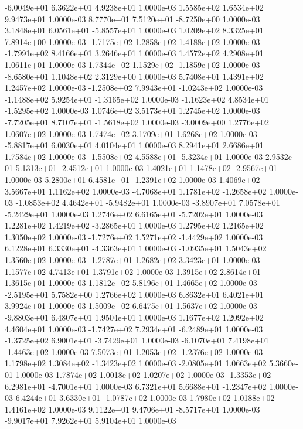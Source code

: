 -6.0049e+01  6.3622e+01  4.9238e+01  1.0000e-03
1.5585e+02 1.6534e+02 9.9473e+01  1.0000e-03
 8.7770e+01  7.5120e+01 -8.7250e+00  1.0000e-03
 3.1848e+01  6.0561e+01 -5.8557e+01  1.0000e-03
1.0209e+02 8.3325e+01 7.8914e+00  1.0000e-03
-1.7175e+02  1.2858e+02  1.4188e+02  1.0000e-03
-1.7991e+02  8.4166e+01  3.2646e+01  1.0000e-03
1.4572e+02 4.2908e+01 1.0611e+01  1.0000e-03
 1.7344e+02  1.1529e+02 -1.1859e+02  1.0000e-03
-8.6580e+01  1.1048e+02  2.3129e+00  1.0000e-03
5.7408e+01 1.4391e+02 1.2457e+02  1.0000e-03
-1.2508e+02  7.9943e+01 -1.0243e+02  1.0000e-03
-1.1488e+02  5.9254e+01 -1.3165e+02  1.0000e-03
-1.1623e+02  4.8534e+01 -1.5295e+02  1.0000e-03
1.0746e+02 3.5173e+01 1.2745e+02  1.0000e-03
-7.7205e+01  8.7107e+01 -1.5618e+02  1.0000e-03
-3.0009e+00  1.2776e+02  1.0607e+02  1.0000e-03
1.7474e+02 3.1709e+01 1.6268e+02  1.0000e-03
-5.8817e+01  6.0030e+01  4.0104e+01  1.0000e-03
8.2941e+01 2.6686e+01 1.7584e+02  1.0000e-03
-1.5508e+02  4.5588e+01 -5.3234e+01  1.0000e-03
 2.9532e-01  5.1313e+01 -2.4512e+01  1.0000e-03
 1.4021e+01  1.1478e+02 -2.9567e+01  1.0000e-03
 5.2800e+01  6.4581e+01 -1.2391e+02  1.0000e-03
1.4069e+02 3.5667e+01 1.1162e+02  1.0000e-03
-4.7068e+01  1.1781e+02 -1.2658e+02  1.0000e-03
-1.0853e+02  4.4642e+01 -5.9482e+01  1.0000e-03
-3.8907e+01  7.0578e+01 -5.2429e+01  1.0000e-03
 1.2746e+02  6.6165e+01 -5.7202e+01  1.0000e-03
 1.2281e+02  1.4219e+02 -3.2865e+01  1.0000e-03
1.2795e+02 1.2165e+02 1.3050e+02  1.0000e-03
-1.7276e+02  1.5271e+02 -1.4429e+02  1.0000e-03
 6.1228e+01  6.3330e+01 -4.3363e+01  1.0000e-03
-1.0935e+01  1.5043e+02  1.3560e+02  1.0000e-03
-1.2787e+01  1.2682e+02  3.3423e+01  1.0000e-03
1.1577e+02 4.7413e+01 1.3791e+02  1.0000e-03
1.3915e+02 2.8614e+01 1.3615e+01  1.0000e-03
1.1812e+02 5.8196e+01 1.4665e+02  1.0000e-03
-2.5195e+01  5.7582e+00  1.2766e+02  1.0000e-03
6.8632e+01 6.4021e+01 3.9924e+01  1.0000e-03
1.5009e+02 6.6475e+01 1.5637e+02  1.0000e-03
-9.8803e+01  6.4807e+01  1.9504e+01  1.0000e-03
1.1677e+02 1.2092e+02 4.4604e+01  1.0000e-03
-1.7427e+02  7.2934e+01 -6.2489e+01  1.0000e-03
-1.3725e+02  6.9001e+01 -3.7429e+01  1.0000e-03
-6.1070e+01  7.4198e+01 -1.4463e+02  1.0000e-03
 7.5073e+01  1.2053e+02 -1.2376e+02  1.0000e-03
 1.1798e+02  1.3084e+02 -1.3423e+02  1.0000e-03
-2.0805e+01  1.0663e+02  5.3660e-01  1.0000e-03
1.7874e+02 1.0018e+02 1.0207e+02  1.0000e-03
-1.3353e+02  6.2981e+01 -4.7001e+01  1.0000e-03
 6.7321e+01  5.6688e+01 -1.2347e+02  1.0000e-03
 6.4244e+01  3.6330e+01 -1.0787e+02  1.0000e-03
1.7980e+02 1.0188e+02 1.4161e+02  1.0000e-03
 9.1122e+01  9.4706e+01 -8.5717e+01  1.0000e-03
-9.9017e+01  7.9262e+01  5.9104e+01  1.0000e-03
